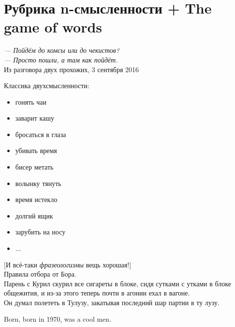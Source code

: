 \section{Рубрика n-смысленности + The game of words}

\begin{displayquote}
    \begin{flushright}
        \textit{--- Пойдём до комсы или до чекистов?\\
        --- Просто пошли, а там как пойдёт.}\\
        Из разговора двух прохожих, 3 сентября 2016
    \end{flushright}
\end{displayquote}

Классика двухсмысленности:
\begin{itemize}
    \item гонять чаи\\
    \item заварит кашу\\
    \item бросаться в глаза\\
    \item убивать время\\
    \item бисер метать\\
    \item волынку тянуть\\
    \item время истекло\\
    \item долгий ящик\\
    \item зарубить на носу\\
    \item ...\\
\end{itemize}

[И всё-таки \emph{фразеологизмы} вещь хорошая!]\\


Правила отбора от Бора.\\


Парень с Курил скурил все сигареты в блоке, сидя сутками с утками
в блоке общежития, и из-за этого теперь почти в агонии ехал в
вагоне.\\


Он думал полететь в Тулузу, закатывая последний шар партии в ту
лузу.


Born, born in 1970, was a cool men.


